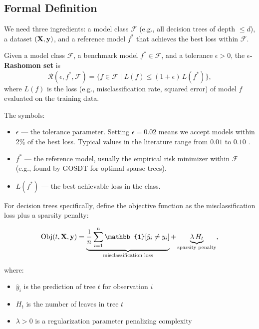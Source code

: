 \subsection{Formal Definition}

We need three ingredients: a model class $\mathcal{F}$ (e.g., all decision
trees of depth $\leq d$), a dataset $(\mathbf{X}, \mathbf{y})$, and a reference model
$f^*$ that achieves the best loss within $\mathcal{F}$.

\begin{definition}
Given a model class $\mathcal{F}$, a benchmark model $f^* \in \mathcal{F}$,
and a tolerance $\epsilon > 0$, the \textbf{$\epsilon$-Rashomon set} is
\begin{equation}\label{eq:rashomon-set}
  \mathcal{R}(\epsilon, f^*, \mathcal{F})
    = \bigl\{f \in \mathcal{F} \;\big|\;
      L(f) \leq (1 + \epsilon)\,L(f^*)\bigr\},
\end{equation}
where $L(f)$ is the loss (e.g., misclassification rate, squared error) of
model $f$ evaluated on the training data.
\end{definition}

\noindent The symbols:
\begin{itemize}[leftmargin=1.8em]
  \item $\epsilon$ --- the tolerance parameter.  Setting $\epsilon = 0.02$
    means we accept models within 2\% of the best loss.  Typical values
    in the literature range from $0.01$ to $0.10$ \citep{XinEtAl2022}.
  \item $f^*$ --- the reference model, usually the empirical risk minimizer
    within $\mathcal{F}$ (e.g., found by GOSDT for optimal sparse trees).
  \item $L(f^*)$ --- the best achievable loss in the class.
\end{itemize}

For decision trees specifically, \citet{XinEtAl2022} define the objective
function as the misclassification loss plus a sparsity penalty:

\begin{equation}\label{eq:tree-objective}
  \operatorname{Obj}(t, \bX, \by) =
    \underbrace{\frac{1}{n}\sum_{i=1}^{n} \mathbb{1}[\hat{y}_i \neq y_i]}_{\text{misclassification loss}}
    + \underbrace{\lambda \, H_t}_{\text{sparsity penalty}},
\end{equation}

\noindent where:
\begin{itemize}[leftmargin=1.8em]
  \item $\hat{y}_i$ is the prediction of tree $t$ for observation $i$
  \item $H_t$ is the number of leaves in tree $t$
  \item $\lambda > 0$ is a regularization parameter penalizing complexity
\end{itemize}

